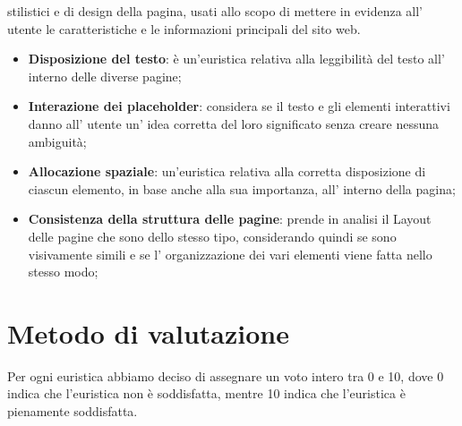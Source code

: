 \begin{itemize}
        stilistici e di design della pagina, usati allo scopo di mettere in
        evidenza all' utente le caratteristiche e le informazioni principali
        del sito web.
        \begin{itemize}
            \item \textbf{Disposizione del testo}: è un'euristica relativa
            alla leggibilità del testo all' interno delle diverse pagine;
            \item \textbf{Interazione dei placeholder}:  considera se il
            testo e gli elementi interattivi danno all' utente un' idea
            corretta del loro significato senza creare nessuna ambiguità;
            \item \textbf{Allocazione spaziale}: un'euristica relativa alla
            corretta disposizione di ciascun elemento, in base anche alla
            sua importanza, all' interno della pagina;
            \item \textbf{Consistenza della struttura delle pagine}: prende
            in analisi il Layout delle pagine che sono dello stesso tipo,
            considerando quindi se sono visivamente simili e se l'
            organizzazione dei vari elementi viene fatta nello stesso modo;
        \end{itemize}
    \end{itemize}
    \section{Metodo di valutazione}
    Per ogni euristica abbiamo deciso di assegnare un voto intero tra 0 e 10,
    dove 0 indica che l'euristica non è soddisfatta, mentre 10 indica che
    l'euristica è pienamente soddisfatta.